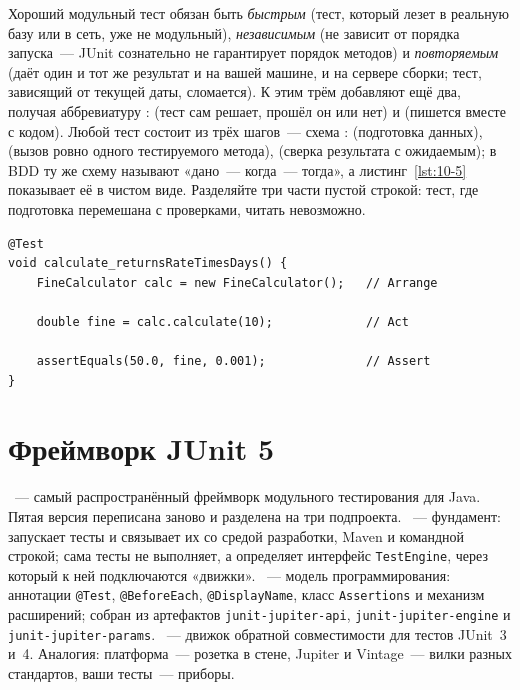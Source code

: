 Хороший модульный тест обязан быть \emph{быстрым} (тест, который лезет в реальную базу или в сеть, уже не модульный), \emph{независимым} (не зависит от порядка запуска~--- JUnit сознательно не гарантирует порядок методов) и \emph{повторяемым} (даёт один и тот же результат и на вашей машине, и на сервере сборки; тест, зависящий от текущей даты, сломается). К этим трём добавляют ещё два, получая аббревиатуру :  (тест сам решает, прошёл он или нет) и  (пишется вместе с кодом). Любой тест состоит из трёх шагов~--- схема :  (подготовка данных),  (вызов ровно одного тестируемого метода),  (сверка результата с ожидаемым); в BDD ту же схему называют «дано~--- когда~--- тогда», а листинг~\ref{lst:10-5} показывает её в чистом виде. Разделяйте три части пустой строкой: тест, где подготовка перемешана с проверками, читать невозможно.

\begin{listing}[H]
\begin{verbatim}
@Test
void calculate_returnsRateTimesDays() {
    FineCalculator calc = new FineCalculator();   // Arrange

    double fine = calc.calculate(10);             // Act

    assertEquals(50.0, fine, 0.001);              // Assert
}
\end{verbatim}
\caption{Тест, построенный по схеме AAA}
\label{lst:10-5}
\end{listing}

\section{Фреймворк JUnit 5}

~--- самый распространённый фреймворк модульного тестирования для Java. Пятая версия переписана заново и разделена на три подпроекта. ~--- фундамент: запускает тесты и связывает их со средой разработки, Maven и командной строкой; сама тесты не выполняет, а определяет интерфейс \texttt{TestEngine}, через который к ней подключаются «движки». ~--- модель программирования: аннотации \texttt{@Test}, \texttt{@BeforeEach}, \texttt{@DisplayName}, класс \texttt{Assertions} и механизм расширений; собран из артефактов \texttt{junit-jupiter-api}, \texttt{junit-jupiter-engine} и \texttt{junit-jupiter-params}. ~--- движок обратной совместимости для тестов JUnit~3 и~4. Аналогия: платформа~--- розетка в стене, Jupiter и Vintage~--- вилки разных стандартов, ваши тесты~--- приборы.

